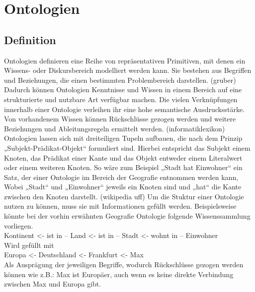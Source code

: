 \chapter{Ontologien}
\section{Definition}
Ontologien definieren eine Reihe von repräsentativen Primitiven, mit denen ein Wissens- oder Diskursbereich modelliert werden kann. Sie bestehen aus Begriffen und Beziehungen, die einen bestimmten Problembereich darstellen. (gruber) \newline
Dadurch können Ontologien Kenntnisse und Wissen in einem Bereich auf eine strukturierte und nutzbare Art verfügbar machen. Die vielen Verknüpfungen innerhalb einer Ontologie verleihen ihr eine hohe semantische Ausdrucksstärke. Von vorhandenem Wissen können Rückschlüsse gezogen werden und weitere Beziehungen und Ableitungsregeln ermittelt werden. (informatiklexikon)\newline
Ontologien lassen sich mit dreiteiligen Tupeln aufbauen, die nach dem Prinzip „Subjekt-Prädikat-Objekt“ formuliert sind. Hierbei entspricht das Subjekt einem Knoten, das Prädikat einer Kante und das Objekt entweder einem Literalwert oder einem weiteren Knoten. So wäre zum Beispiel „Stadt hat Einwohner“ ein Satz, der einer Ontologie im Bereich der Geografie entnommen werden kann, Wobei „Stadt“ und „Einwohner“ jeweils ein Knoten sind und „hat“ die Kante zwischen den Knoten darstellt. (wikipedia uff)\newline
Um die Stuktur einer Ontologie nutzen zu können, muss sie mit Informationen gefüllt werden. Beispielsweise könnte bei der vorhin erwähnten Geografie Ontologie folgende Wissenssammlung vorliegen.\\

Kontinent <- ist in – Land <- ist in – Stadt <- wohnt in – Einwohner \\

Wird gefüllt mit \\

Europa <- Deutschland <- Frankfurt <- Max \\

Als Ausprägung der jeweiligen Begriffe, wodurch Rückschlüsse gezogen werden können wie z.B.: Max ist Europäer, auch wenn es keine direkte Verbindung zwischen Max und Europa gibt.
